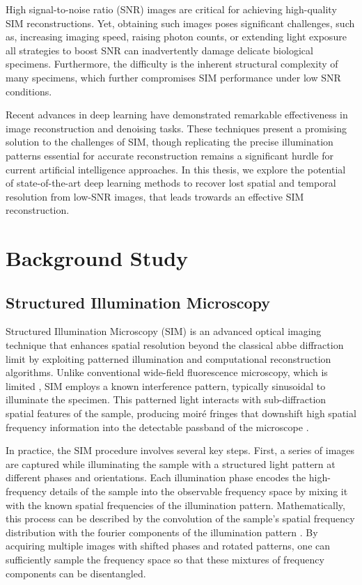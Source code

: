 \documentclass[11pt,
  paper=a4, 
  bibliography=totocnumbered,
	captions=tableheading,
	BCOR=10mm
]{scrreprt}
\theoremstyle{definition}
\begin{document}
\vspace{1cm}
\noindent
High signal-to-noise ratio (SNR) images are critical for achieving high-quality SIM reconstructions. 
Yet, obtaining such images poses significant challenges, such as, increasing imaging speed, raising photon counts,
 or extending light exposure all strategies to boost SNR can inadvertently damage delicate biological specimens.
Furthermore, the difficulty is the inherent structural complexity of many specimens, which further compromises SIM performance under low SNR conditions.


\vspace{1cm}
\noindent
Recent advances in deep learning have demonstrated remarkable effectiveness in image reconstruction and denoising tasks. 
These techniques present a promising solution to the challenges of SIM, though replicating the precise illumination patterns essential for accurate 
reconstruction remains a significant hurdle for current artificial intelligence approaches. In this thesis, we explore the potential of state-of-the-art 
deep learning methods to recover lost spatial and temporal resolution from low-SNR images, that leads trowards an effective SIM reconstruction.

\chapter{Background Study}

\section{Structured Illumination Microscopy}

Structured Illumination Microscopy (SIM) is an advanced optical imaging technique that enhances spatial resolution beyond the classical abbe diffraction limit 
by exploiting patterned illumination and computational reconstruction algorithms. Unlike conventional wide-field fluorescence microscopy, which is limited \cite{abbe}, 
SIM employs a known interference pattern, typically sinusoidal to illuminate the specimen. This patterned light interacts with
sub-diffraction spatial features of the sample, producing moiré fringes that downshift high spatial frequency information into the detectable passband
 of the microscope \cite{gustafson}.

\vspace{1cm}
\noindent
In practice, the SIM procedure involves several key steps. First, a series of images are captured while illuminating the sample with a structured 
light pattern at different phases and orientations. Each illumination phase encodes the high-frequency details of the sample into the observable 
frequency space by mixing it with the known spatial frequencies of the illumination pattern. Mathematically, this process can be described by the 
convolution of the sample’s spatial frequency distribution with the fourier components of the illumination pattern \cite{gustafson}. By 
acquiring multiple images with shifted phases and rotated patterns, one can sufficiently sample the frequency space so that these mixtures 
of frequency components can be disentangled.
\end{document}
